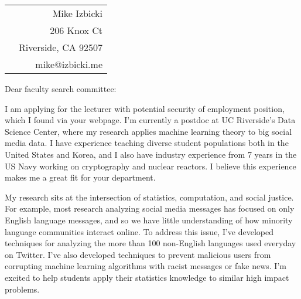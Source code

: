 \documentclass[12pt]{article}
\begin{document}
\noindent
\hspace{-0.13in}
\begin{tabularx}{1.03\textwidth}{Xr}
 & Mike Izbicki \\
 & 206 Knox Ct\\
 & Riverside, CA 92507\\
 & mike@izbicki.me\\
\end{tabularx}

\vspace{0.2in}

\setlength{\parskip}{15pt plus4mm minus3mm}

\noindent
Dear faculty search committee:

\noindent
I am applying for the lecturer with potential security of employment position, which I found via your webpage.
I'm currently a postdoc at UC Riverside's Data Science Center,
where my research applies machine learning theory to big social media data.
I have experience teaching diverse student populations both in the United States and Korea,
and I also have industry experience from 7 years in the US Navy working on cryptography and nuclear reactors.
I believe this experience makes me a great fit for your department.

\noindent
My research sits at the intersection of statistics, computation, and social justice.
For example, most research analyzing social media messages has focused on only English language messages,
and so we have little understanding of how minority language communities interact online.
To address this issue, I've developed techniques for analyzing the more than 100 non-English languages used everyday on Twitter.
I've also developed techniques to prevent malicious users from corrupting machine learning algorithms with racist messages or fake news.
I'm excited to help students apply their statistics knowledge to similar high impact problems.
\end{document}
